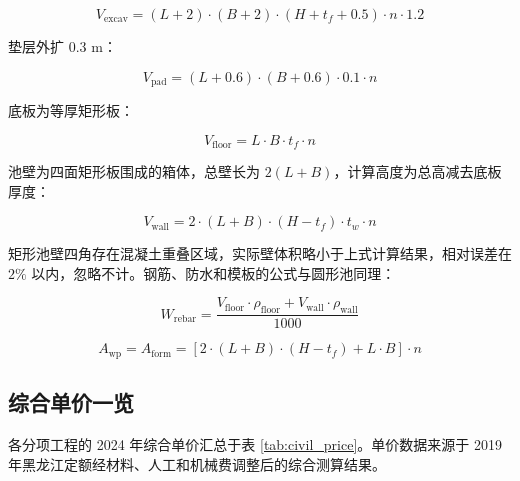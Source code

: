 \documentclass[12pt,a4paper]{ctexart}
\begin{document}
\begin{equation}
V_{\text{excav}} = (L + 2) \cdot (B + 2) \cdot (H + t_f + 0.5) \cdot n \cdot 1.2
\end{equation}

垫层外扩 0.3 m：

\begin{equation}
V_{\text{pad}} = (L + 0.6) \cdot (B + 0.6) \cdot 0.1 \cdot n
\end{equation}

底板为等厚矩形板：

\begin{equation}
V_{\text{floor}} = L \cdot B \cdot t_f \cdot n
\end{equation}

池壁为四面矩形板围成的箱体，总壁长为 $2(L + B)$，计算高度为总高减去底板厚度：

\begin{equation}
V_{\text{wall}} = 2 \cdot (L + B) \cdot (H - t_f) \cdot t_w \cdot n
\end{equation}

矩形池壁四角存在混凝土重叠区域，实际壁体积略小于上式计算结果，相对误差在 $2\%$ 以内，忽略不计。钢筋、防水和模板的公式与圆形池同理：

\begin{equation}
W_{\text{rebar}} = \frac{V_{\text{floor}} \cdot \rho_{\text{floor}} + V_{\text{wall}} \cdot \rho_{\text{wall}}}{1000}
\end{equation}

\begin{equation}
A_{\text{wp}} = A_{\text{form}} = \left[2 \cdot (L + B) \cdot (H - t_f) + L \cdot B\right] \cdot n
\end{equation}

\subsection{综合单价一览}

各分项工程的 2024 年综合单价汇总于表 \ref{tab:civil_price}。单价数据来源于 2019 年黑龙江定额经材料、人工和机械费调整后的综合测算结果。
\end{document}

